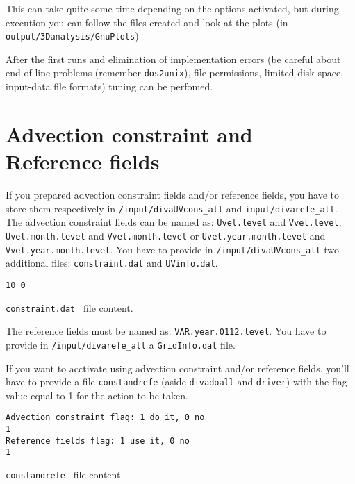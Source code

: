 \documentclass[8pt,a4paper,notitlepage]{book}
\begin{document}
This can take quite some time depending on the options activated, but during execution you can follow the files created and look at the plots (in {\tt output/3Danalysis/GnuPlots})




After the first runs and elimination of implementation errors (be careful about end-of-line problems (remember {\tt dos2unix}), file permissions, limited disk space, input-data file formats) tuning can be perfomed.

\section{Advection constraint and Reference fields}
If you prepared advection constraint fields and/or reference fields, you have to store them respectively in {\tt /input/divaUVcons\_all} and {\tt input/divarefe\_all}. The advection constraint fields can be named as: {\tt Uvel.level} and {\tt Vvel.level}, {\tt Uvel.month.level} and {\tt Vvel.month.level} or {\tt Uvel.year.month.level} and {\tt Vvel.year.month.level}. You have to provide in {\tt /input/divaUVcons\_all} two additional files: {\tt constraint.dat} and {\tt UVinfo.dat}.
 
\begin{exfile}[H]
\begin{footnotesize}
\begin{verbatim}
10 0
\end{verbatim}
\end{footnotesize}
\caption{{\tt constraint.dat } file content.} 
\end{exfile}

 The reference fields must be named as: {\tt VAR.year.0112.level}. You have to provide in {\tt /input/divarefe\_all} a {\tt GridInfo.dat} file.

If you want to acctivate using advection constraint and/or reference fields, you'll have to provide a file {\tt constandrefe} (aside {\tt divadoall} and {\tt driver}) with the flag value equal to 1 for the action to be taken.
 
\begin{exfile}[H]
\begin{footnotesize}
\begin{verbatim}
Advection constraint flag: 1 do it, 0 no
1
Reference fields flag: 1 use it, 0 no
1
\end{verbatim}
\end{footnotesize}
\caption{{\tt constandrefe } file content.} 
\end{exfile}
\end{document}
